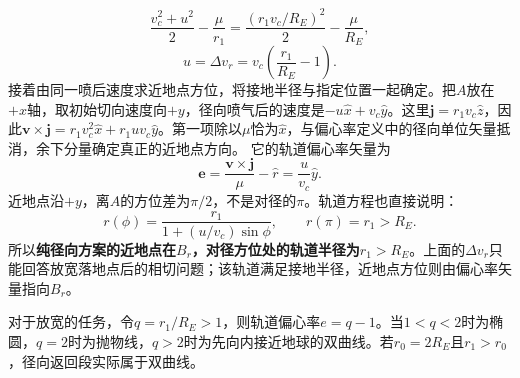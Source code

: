 \documentclass[UTF8,fontset=fandol,a4paper,11pt]{ctexart}
\begin{document}
\[
\frac{v_c^2+u^2}{2}-\frac{\mu}{r_1}
=\frac{(r_1v_c/R_E)^2}{2}-\frac{\mu}{R_E},
\]
\[
\boxed{u=\Delta v_r=v_c\left(\frac{r_1}{R_E}-1\right)}.
\]
接着由同一喷后速度求近地点方位，将接地半径与指定位置一起确定。把$A$放在$+x$轴，取初始切向速度向$+y$，径向喷气后的速度是$-u\hat x+v_c\hat y$。这里$\boldsymbol j=r_1v_c\hat z$，因此$\boldsymbol v\times\boldsymbol j=r_1v_c^2\hat x+r_1uv_c\hat y$。第一项除以$\mu$恰为$\hat x$，与偏心率定义中的径向单位矢量抵消，余下分量确定真正的近地点方向。
它的轨道偏心率矢量为
\[
\boldsymbol e=\frac{\boldsymbol v\times\boldsymbol j}{\mu}-\hat r
=\frac{u}{v_c}\hat y.
\]
近地点沿$+y$，离$A$的方位差为$\pi/2$，不是对径的$\pi$。轨道方程也直接说明：
\[
r(\phi)=\frac{r_1}{1+(u/v_c)\sin\phi},
\qquad r(\pi)=r_1>R_E.
\]
所以\textbf{纯径向方案的近地点在$B_r$，对径方位处的轨道半径为$r_1>R_E$}。上面的$\Delta v_r$只能回答放宽落地点后的相切问题；该轨道满足接地半径，近地点方位则由偏心率矢量指向$B_r$。

对于放宽的任务，令$q=r_1/R_E>1$，则轨道偏心率$e=q-1$。当$1<q<2$时为椭圆，$q=2$时为抛物线，$q>2$时为先向内接近地球的双曲线。若$r_0=2R_E$且$r_1>r_0$，径向返回段实际属于双曲线。
\end{document}
